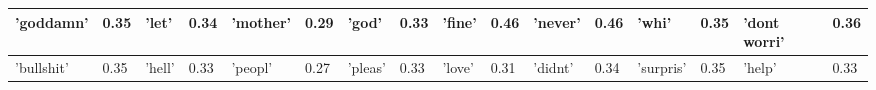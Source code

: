 \documentclass[journal]{./IEEE/IEEEtran}
\begin{document}
\begin{table}
{\begin{tabular}{|ll|ll|ll|ll|ll|ll|ll|ll|}
    \hline
    \multicolumn{1}{|l|}{'goddamn'} & 0.35        & \multicolumn{1}{l|}{'let'}  & 0.34       & \multicolumn{1}{l|}{'mother'} & 0.29        & \multicolumn{1}{l|}{'god'}    & 0.33        & \multicolumn{1}{l|}{'fine'}  & 0.46        & \multicolumn{1}{l|}{'never'} & 0.46        & \multicolumn{1}{l|}{'whi'}        & 0.35        & \multicolumn{1}{l|}{'dont worri'} & 0.36        \\ 
    \hline
    \multicolumn{1}{|l|}{'bullshit'} & 0.35        & \multicolumn{1}{l|}{'hell'} & 0.33       & \multicolumn{1}{l|}{'peopl'}   & 0.27        & \multicolumn{1}{l|}{'pleas'}  & 0.33        & \multicolumn{1}{l|}{'love'}  & 0.31       & \multicolumn{1}{l|}{'didnt'} & 0.34        & \multicolumn{1}{l|}{'surpris'}       & 0.35        & \multicolumn{1}{l|}{'help'}       & 0.33       \\ 
    \hline
    \end{tabular}%
    }
\end{table}
\end{document}
